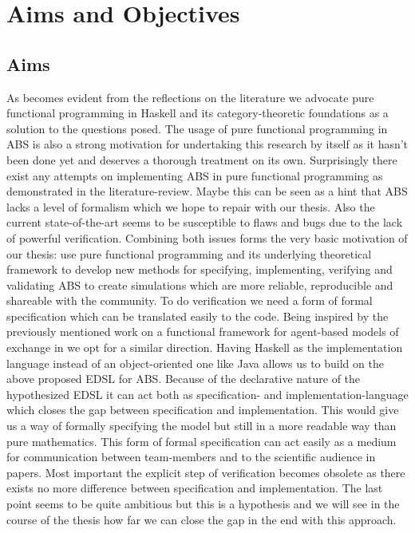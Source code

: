 \chapter{Aims and Objectives}
\label{chap:aimsObj}

\section{Aims}
As becomes evident from the reflections on the literature we advocate pure functional programming in Haskell and its category-theoretic foundations as a solution to the questions posed. The usage of pure functional programming in ABS is also a strong motivation for undertaking this research by itself as it hasn't been done yet and deserves a thorough treatment on its own. Surprisingly there exist any attempts on implementing ABS in pure functional programming as demonstrated in the literature-review. Maybe this can be seen as a hint that ABS lacks a level of formalism which we hope to repair with our thesis. Also the current state-of-the-art seems to be susceptible to flaws and bugs due to the lack of powerful verification. Combining both issues forms the very basic motivation of our thesis: use pure functional programming and its underlying theoretical framework to develop new methods for specifying, implementing, verifying and validating ABS to create simulations which are more reliable, reproducible and shareable with the community.
To do verification we need a form of formal specification which can be translated easily to the code. Being inspired by the previously mentioned work on a functional framework for agent-based models of exchange in \cite{botta_functional_2011} we opt for a similar direction. Having Haskell as the implementation language instead of an object-oriented one like Java allows us to build on the above proposed EDSL for ABS. Because of the declarative nature of the hypothesized EDSL it can act both as specification- and implementation-language which closes the gap between specification and implementation. This would give us a way of formally specifying the model but still in a more readable way than pure mathematics. This form of formal specification can act easily as a medium for communication between team-members and to the scientific audience in papers. Most important the explicit step of verification becomes obsolete as there exists no more difference between specification and implementation. The last point seems to be quite ambitious but this is a hypothesis and we will see in the course of the thesis how far we can close the gap in the end with this approach.
